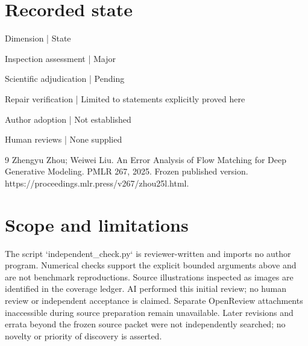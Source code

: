 \documentclass[10pt]{article}
\begin{document}
\section*{Recorded state}
Dimension | State\par
Inspection assessment | Major\par
Scientific adjudication | Pending\par
Repair verification | Limited to statements explicitly proved here\par
Author adoption | Not established\par
Human reviews | None supplied\par
9 Zhengyu Zhou; Weiwei Liu. An Error Analysis of Flow Matching for Deep Generative Modeling. PMLR 267, 2025. Frozen published version. https://proceedings.mlr.press/v267/zhou25l.html.\par
\section*{Scope and limitations}
The script `independent\_check.py` is reviewer-written and imports no author program. Numerical checks support the explicit bounded arguments above and are not benchmark reproductions. Source illustrations inspected as images are identified in the coverage ledger. AI performed this initial review; no human review or independent acceptance is claimed. Separate OpenReview attachments inaccessible during source preparation remain unavailable. Later revisions and errata beyond the frozen source packet were not independently searched; no novelty or priority of discovery is asserted.\par
\end{document}
